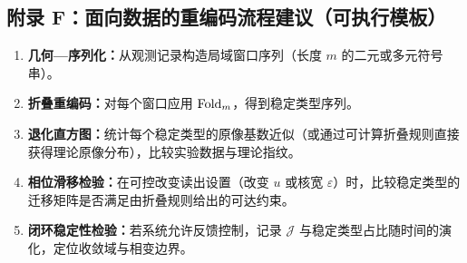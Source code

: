 \subsection{附录 F：面向数据的重编码流程建议（可执行模板）}

\begin{enumerate}
  \item \textbf{几何—序列化：}从观测记录构造局域窗口序列（长度 $m$ 的二元或多元符号串）。
  \item \textbf{折叠重编码：}对每个窗口应用 $\mathrm{Fold}_m$，得到稳定类型序列。
  \item \textbf{退化直方图：}统计每个稳定类型的原像基数近似（或通过可计算折叠规则直接获得理论原像分布），比较实验数据与理论指纹。
  \item \textbf{相位滑移检验：}在可控改变读出设置（改变 $u$ 或核宽 $\varepsilon$）时，比较稳定类型的迁移矩阵是否满足由折叠规则给出的可达约束。
  \item \textbf{闭环稳定性检验：}若系统允许反馈控制，记录 $\mathcal{J}$ 与稳定类型占比随时间的演化，定位收敛域与相变边界。
\end{enumerate}

